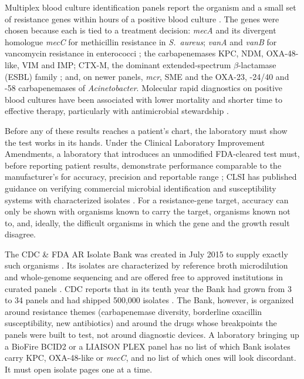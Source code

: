 \documentclass[10pt,twocolumn,letterpaper]{article}
\newcommand{\g}[1]{\textit{#1}}  %
\newcommand{\sau}{\textit{S.~aureus}}
\begin{document}
Multiplex blood culture identification panels report the organism and a small set of resistance genes within hours of a
positive blood culture \cite{bcid2_2022,verigene2015}. The genes were chosen because each is tied to a treatment
decision: \g{mecA} and its divergent homologue \g{mecC} \cite{garcia2011} for methicillin resistance in \sau{};
\g{vanA} and \g{vanB} for vancomycin resistance in enterococci \cite{courvalin2006}; the carbapenemases KPC, NDM, OXA-48-like, VIM and IMP; CTX-M, the dominant extended-spectrum
$\beta$-lactamase (ESBL) family \cite{bevan2017,bush2020}; and, on newer panels, \g{mcr}, SME and the OXA-23, -24/40 and
-58 carbapenemases of \textit{Acinetobacter}. Molecular rapid diagnostics on positive blood cultures have been
associated with lower mortality and shorter time to effective therapy, particularly with antimicrobial stewardship
\cite{timbrook2017,banerjee2021}.

Before any of these results reaches a patient's chart, the laboratory must show the test works in its hands. Under the
Clinical Laboratory Improvement Amendments, a laboratory that introduces an unmodified FDA-cleared test must, before
reporting patient results, demonstrate performance comparable to the manufacturer's for accuracy, precision and
reportable range \cite{clia}; CLSI has published guidance on verifying commercial microbial identification and susceptibility
systems with characterized isolates \cite{clsim52}. For a resistance-gene
target, accuracy can only be shown with organisms known to carry the target, organisms known not to, and, ideally, the
difficult organisms in which the gene and the growth result disagree.

The CDC \& FDA AR Isolate Bank was created in July 2015 to supply exactly such organisms \cite{lutgring2018}. Its
isolates are characterized by reference broth microdilution and whole-genome sequencing and are offered free to
approved institutions in curated panels \cite{lutgring2018,arbankweb}. CDC reports that in its tenth year the Bank had
grown from 3 to 34 panels and had shipped 500,000 isolates \cite{cdc10yr}. The Bank, however, is organized around
resistance themes (carbapenemase diversity, borderline oxacillin susceptibility, new antibiotics) and around the drugs
whose breakpoints the panels were built to test, not around diagnostic devices. A laboratory bringing up a BioFire BCID2
or a LIAISON PLEX panel has no list of which Bank isolates carry KPC, OXA-48-like or \g{mecC}, and no list of which ones
will look discordant. It must open isolate pages one at a time.
\end{document}
